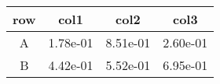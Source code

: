 \begin{tabular}{cccc}
\toprule
row&col1&col2&col3\tabularnewline
\midrule
A&1.78e-01&8.51e-01&2.60e-01\tabularnewline
B&4.42e-01&5.52e-01&6.95e-01\tabularnewline
\bottomrule
\end{tabular}
